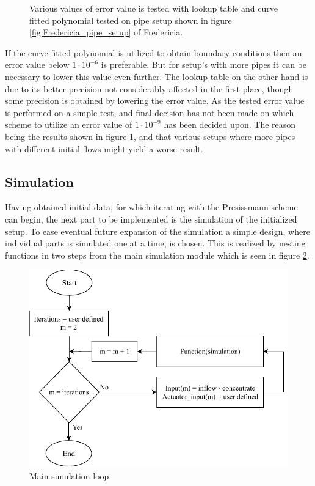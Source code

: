 \begin{figure}[H]
 \centering
 
\caption{Various values of error value is tested with lookup table and curve fitted polynomial tested on pipe setup shown in figure \ref{fig:Fredericia_pipe_setup} of Fredericia.}
\label{fig:error_value_test}
\end{figure} 

If the curve fitted polynomial is utilized to obtain boundary conditions then an error value below $1\cdot10^{-6}$ is preferable. But for setup's with more pipes it can be necessary to lower this value even further. The lookup table on the other hand is due to its better precision not considerably affected in the first place, though some precision is obtained by lowering the error value. As the tested error value is performed on a simple test, and final decision has not been made on which scheme to utilize an error value of $1\cdot10^{-9}$ has been decided upon. The reason being the results shown in figure \ref{fig:error_value_test}, and that various setups where more pipes with different initial flows might yield a worse result.


\subsection*{Simulation}

Having obtained initial data, for which iterating with the Presissmann scheme can begin, the next part to be implemented is the simulation of the initialized setup.
To ease eventual future expansion of the simulation a simple design, where individual parts is simulated one at a time, is chosen. This is realized by nesting functions in two steps from the main simulation module which is seen in figure \ref{fig:simu_main_chart}.

\begin{figure}[H]
\centering
\includegraphics[width=0.7 \textwidth]{report/simulation/pictures/simu_main_chart.pdf}
\caption{Main simulation loop.}
\label{fig:simu_main_chart}
\end{figure}

